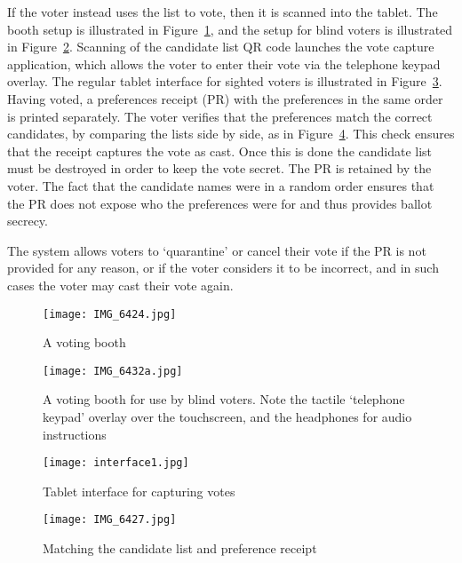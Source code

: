 \documentclass[twocolumn]{article}
\begin{document}
If the voter instead uses the list to vote, then it is scanned into the tablet.  The booth setup is illustrated in Figure~\ref{fig:booth}, and the setup for blind voters is illustrated in Figure~\ref{fig:blindvoters}.  Scanning of the candidate list QR code launches the vote capture application, which allows the voter to enter their vote via the telephone keypad overlay.  The regular tablet interface for sighted voters is illustrated in Figure~\ref{fig:interface}.  Having voted, a preferences receipt (PR) with the preferences in the same order is printed separately.  The voter verifies that the preferences match the correct candidates, by comparing the lists side by side, as in Figure~\ref{fig:CLPR}.  This check ensures that the receipt captures the vote as cast.  Once this is done the candidate list must be destroyed in order to keep the vote secret.  The PR is retained by the voter.  The fact that the candidate names were in a random order ensures that the PR does not expose who the preferences were for and thus provides ballot secrecy.  

The system allows voters to `quarantine' or cancel their vote if the PR is not provided for any reason, or if the voter considers it to be incorrect, and in such cases the voter may cast their vote again.

\begin{figure}
\begin{center}
\texttt{[image: IMG\_6424.jpg]}
\end{center}
\caption{A voting booth} 
\label{fig:booth}
\end{figure}

\begin{figure}
\begin{center}
\texttt{[image: IMG\_6432a.jpg]}
\end{center}
\caption{A voting booth for use by blind voters.  Note the tactile `telephone keypad' overlay over the touchscreen, and the headphones for audio instructions} 
\label{fig:blindvoters}
\end{figure}

\begin{figure}
\begin{center}
\texttt{[image: interface1.jpg]}
\end{center}
\caption{Tablet interface for capturing votes} 
\label{fig:interface}
\end{figure}

\begin{figure}
\begin{center}
\texttt{[image: IMG\_6427.jpg]}
\end{center}
\caption{Matching the candidate list and preference receipt} 
\label{fig:CLPR}
\end{figure}
\end{document}
